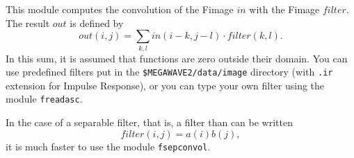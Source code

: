 This module computes the convolution of the Fimage $in$ with the Fimage
$filter$. The result $out$ is defined by
$$out(i,j) = \sum_{k,l} in(i-k,j-l) \cdot filter(k,l).$$
In this sum, it is assumed that functions are zero outside their
domain.
You can use predefined filters put in the \verb+$MEGAWAVE2/data/image+ 
directory (with \verb+.ir+ extension for Impulse Response), 
or you can type your own filter using the module \verb+freadasc+.

\smallskip

In the case of a separable filter, that is, a filter than can be
written
$$filter(i,j)=a(i)b(j),$$
it is much faster to use the module \verb+fsepconvol+.


